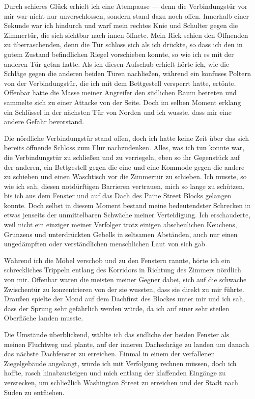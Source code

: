 Durch schieres Glück erhielt ich eine Atempause --- denn die Verbindungstür vor mir war nicht nur unverschlossen, sondern stand dazu noch offen. Innerhalb einer Sekunde war ich hindurch und warf mein rechtes Knie und Schulter gegen die Zimmertür, die sich sichtbar nach innen öffnete. Mein Rick schien den Öffnenden zu überraschenden, denn die Tür schloss sich als ich drückte, so dass ich den in gutem Zustand befindlichen Riegel vorschieben konnte, so wie ich es mit der anderen Tür getan hatte. Als ich diesen Aufschub erhielt hörte ich, wie die Schläge gegen die anderen beiden Türen nachließen, während ein konfuses Poltern von der Verbindungstür, die ich mit dem Bettgestell versperrt hatte, ertönte. Offenbar hatte die Masse meiner Angreifer den südlichen Raum betreten und sammelte sich zu einer Attacke von der Seite. Doch im selben Moment erklang ein Schlüssel in der nächsten Tür von Norden und ich wusste, dass mir eine andere Gefahr bevorstand.

Die nördliche Verbindungstür stand offen, doch ich hatte keine Zeit über das sich bereits öffnende Schloss zum Flur nachzudenken. Alles, was ich tun konnte war, die Verbindungstür zu schließen und zu verriegeln, eben so ihr Gegenstück auf der anderen, ein Bettgestell gegen die eine und eine Kommode gegen die andere zu schieben und einen  Waschtisch vor die Zimmertür zu schieben. Ich musste, so wie ich sah, diesen notdürftigen Barrieren vertrauen, mich so lange zu schützen, bis ich aus dem Fenster und auf das Dach des Paine Street Blocks gelangen konnte. Doch selbst in diesem Moment bestand meine bedeutendster Schrecken in etwas jenseits der unmittelbaren Schwäche meiner Verteidigung. Ich erschauderte, weil nicht ein einziger meiner Verfolger trotz einigen abscheulichen Keuchens, Grunzens und unterdrückten Gebells in seltsamen Abständen, auch nur einen ungedämpften oder verständlichen menschlichen Laut von sich gab.

Während ich die Möbel verschob und zu den Fenstern rannte, hörte ich ein schreckliches Trippeln entlang des Korridors in Richtung des Zimmers nördlich von mir. Offenbar waren die meisten meiner Gegner dabei, sich auf die schwache Zwischentür zu konzentrieren von der sie wussten, dass sie direkt zu mir führte. Draußen spielte der Mond auf dem Dachfirst des Blockes unter mir und ich sah, dass der Sprung sehr gefährlich werden würde, da ich auf einer sehr steilen Oberfläche landen musste.

Die Umstände überblickend, wählte ich das südliche der beiden Fenster als meinen Fluchtweg und plante, auf der inneren Dachschräge zu landen um danach das nächste Dachfenster zu erreichen. Einmal in einem der verfallenen Ziegelgebäude angelangt, würde ich mit Verfolgung rechnen müssen, doch ich hoffte, rasch hinabzusteigen und mich entlang der klaffenden Eingänge zu verstecken, um schließlich Washington Street zu erreichen und der Stadt nach Süden zu entfliehen.

